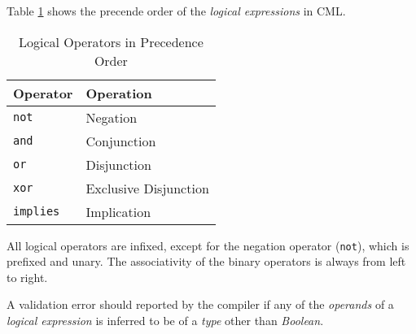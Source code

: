 Table \ref{tab:logical-expr-constraints} shows
the precende order of the \emph{logical expressions} in CML.

\begin{table}[H]
\centering
\begin{tabular}
{ l l }
\hline
Operator & Operation \\
\hline
\verb!not! & Negation \\
\verb!and! & Conjunction \\
\verb!or! & Disjunction \\
\verb!xor! & Exclusive Disjunction \\
\verb!implies! & Implication \\
\end{tabular}
\caption{Logical Operators in Precedence Order}
\label{tab:logical-expr-constraints}
\end{table}

All logical operators are infixed,
except for the negation operator (\verb|not|),
which is prefixed and unary.
The associativity of the binary operators is always from left to right.

A validation error should reported by the compiler if any of the \emph{operands}
of a \emph{logical expression} is inferred to be of a \emph{type}
other than \emph{Boolean}.

